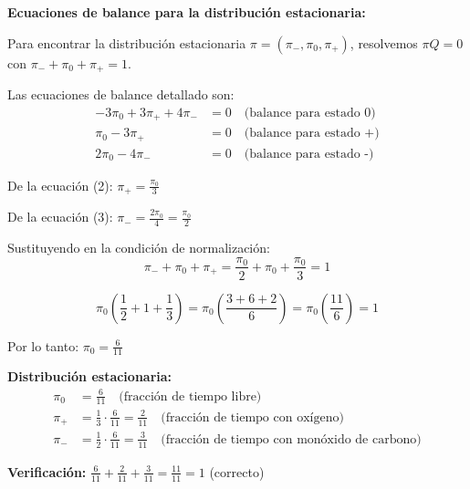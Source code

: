 \documentclass[12pt,a4paper]{article}
\begin{document}
\textbf{Ecuaciones de balance para la distribución estacionaria:}

Para encontrar la distribución estacionaria $\pi = (\pi_-, \pi_0, \pi_+)$, resolvemos $\pi Q = 0$ con $\pi_- + \pi_0 + \pi_+ = 1$.

Las ecuaciones de balance detallado son:
\begin{align}
-3\pi_0 + 3\pi_+ + 4\pi_- &= 0 \quad \text{(balance para estado 0)} \\
\pi_0 - 3\pi_+ &= 0 \quad \text{(balance para estado +)} \\
2\pi_0 - 4\pi_- &= 0 \quad \text{(balance para estado -)}
\end{align}

De la ecuación (2): $\pi_+ = \frac{\pi_0}{3}$

De la ecuación (3): $\pi_- = \frac{2\pi_0}{4} = \frac{\pi_0}{2}$

Sustituyendo en la condición de normalización:
\begin{equation*}
\pi_- + \pi_0 + \pi_+ = \frac{\pi_0}{2} + \pi_0 + \frac{\pi_0}{3} = 1
\end{equation*}

\begin{equation*}
\pi_0\left(\frac{1}{2} + 1 + \frac{1}{3}\right) = \pi_0\left(\frac{3 + 6 + 2}{6}\right) = \pi_0\left(\frac{11}{6}\right) = 1
\end{equation*}

Por lo tanto: $\pi_0 = \frac{6}{11}$

\textbf{Distribución estacionaria:}
\begin{align}
\pi_0 &= \frac{6}{11} \quad \text{(fracción de tiempo libre)} \\
\pi_+ &= \frac{1}{3} \cdot \frac{6}{11} = \frac{2}{11} \quad \text{(fracción de tiempo con oxígeno)} \\
\pi_- &= \frac{1}{2} \cdot \frac{6}{11} = \frac{3}{11} \quad \text{(fracción de tiempo con monóxido de carbono)}
\end{align}

\textbf{Verificación:} $\frac{6}{11} + \frac{2}{11} + \frac{3}{11} = \frac{11}{11} = 1$ (correcto)
\end{document}
